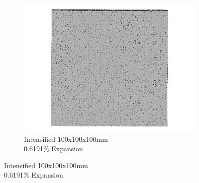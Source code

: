 \begin{figure}[ht!]
\begin{subfigure}{.3\textwidth}
      \includegraphics[width=.9\linewidth]{Files/exp_3D/DEF/A30X-1C_3_3ds.png}
    \caption{Intensified 100x100x100mm  \\ 0.6191\% Expansion}
    \end{subfigure}%


\end{figure}
